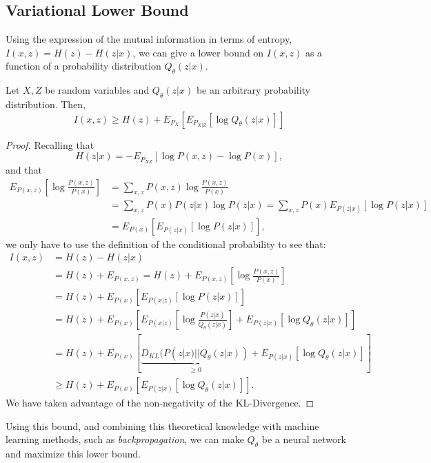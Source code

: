 \subsection*{Variational Lower Bound}



Using the expression of the mutual information in terms of entropy, $I(x,z) = H(z) - H(z|x)$, we can give a lower bound on $I(x,z)$ as a function of a probability distribution $Q_\theta(z|x)$. 

\begin{nprop}
Let $X,Z$ be random variables and $Q_\theta(z|x)$ be an arbitrary probability distribution. Then,
$$
I(x,z) \geq H(z) + E_{P_X} \left[ E_{P_{X|Z}}\left[\log Q_\theta(z|x)\right]\right] 
$$
\end{nprop}

\begin{proof}
Recalling that
$$
H(z|x) = - E_{P_{XZ}} \left[ \log P(x,z) - \log P(x)\right],
$$
and that
\begin{align*}
E_{P(x,z)}\left[\log\frac{P(x,z)}{P(x)}\right] & =  \sum_{x,z} P(x,z) \log\frac{P(x,z)}{P(x)} \\ 
& = \sum_{x,z} P(x)P(z|x) \log P(z|x) = \sum_{x,z} P(x) E_{P(z|x)}[\log P(z|x)]\\
 & =  E_{P(x)}\left[E_{P(z|x)}[\log P(z|x)]\right],
\end{align*}
we only have to use the definition of the conditional probability to see that:
\begin{align*}
I(x,z) & =  H(z) - H(z|x) \\
    & =  H(z) + E_{P(x,z)} = H(z) + E_{P(x,z)} \left[ \log \frac{P(x,z)}{P(x)}\right] \\
    & =  H(z) + E_{P(x)} \left[ E_{P(x|z)}\left[\log P(z|x)\right]\right] \\
    & = H(z) + E_{P(x)} \left[ E_{P(x|z)} \left[\log \frac{P(z|x)}{Q_\theta(z|x)}\right] + E_{P(z|x)}\left[\log Q_\theta(z|x)\right]\right] \\
    & =  H(z) + E_{P(x)}\left[ \underbrace{D_{KL}(P(z|x)||Q_\theta(z|x))}_{\geq 0} + E_{P(z|x)}\left[\log Q_\theta(z|x)\right] \right]\\
    & \geq H(z) + E_{P(x)}\left[E_{P(z|x)}\left[ \log Q_\theta(z|x)\right]\right].
\end{align*}
We have taken advantage of the non-negativity of the KL-Divergence.
\end{proof}

Using this bound, and combining this theoretical knowledge with machine learning methods, such as \emph{backpropagation}, we can make $Q_\theta$ be a neural network and maximize this lower bound.


